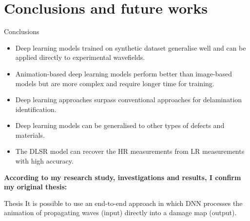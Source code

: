 \documentclass[10pt,aspectratio=169,dvipsnames]{beamer} %
\begin{document}
	\section{Conclusions and future works}
	\begin{frame}{Conclusions}		
		\begin{footnotesize}
			\begin{justify}
				\addtolength{\leftmargini}{\labelsep}
				\begin{itemize}
					\item{Deep learning models trained on synthetic dataset generalise well and can be applied directly to experimental wavefields.}				
					\item{Animation-based deep learning models perform better than image-based models but are more complex and require longer time for training.}
					\item{Deep learning approaches surpass conventional approaches for delamination identification.}
					\item{Deep learning models can be generalised to other types of defects and materials.}
					\item{The DLSR model can recover the HR measurements from LR measurements with high accuracy.}
				\end{itemize}
			\end{justify}				
		\begin{tcolorbox}
			\begin{justify}
				\textbf{According to my research study, investigations and results, I confirm my original thesis:}
				\begin{alertblock}{Thesis}
					It is possible to use an end-to-end approach in which DNN 
					processes the animation of propagating waves (input) directly into a damage map (output).
				\end{alertblock}
			\end{justify}			
		\end{tcolorbox}				
		\end{footnotesize}			
	\end{frame}			
	\note{}	
\end{document}

